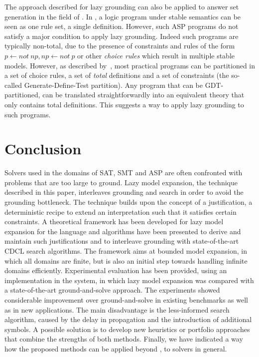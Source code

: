 \documentclass[11pt]{article}
\newcommand{\m}[1]{\ensuremath{#1}\xspace}
\newcommand{\lrule}{\m{\leftarrow}}
\newcommand{\logicname}[1]{\text{\sc #1}\xspace}
\newcommand{\idp}{\logicname{IDP}}
\newcommand{\foid}{\logicname{FO(\ensuremath{ID})}}
\theoremstyle{plain}
\theoremstyle{definition}
\theoremstyle{example_basic}
\theoremstyle{example_contd}
\theoremstyle{plain}
\newcommand{\change}[1]{#1}
\begin{document}
The approach described for lazy grounding can also be applied to answer set generation in the field of \ASP. In \ASP, a logic program under stable semantics can be seen as one rule set, a  single definition. However, such ASP programs do not satisfy a major condition  to apply lazy grounding. Indeed such programs are typically non-total, due to the presence of constraints and rules of the form $p \lrule not~np, np \lrule not~p$ or other \emph{choice rules} which result in multiple stable models.  However, as described by~, most practical \ASP programs can be partitioned in a set of choice rules, a set of \emph{total} definitions and a set of constraints (the so-called Generate-Define-Test partition).  Any \ASP program that can be GDT-partitioned, can be translated straightforwardly into an equivalent \foid theory that only contains total definitions. This suggests a way to apply lazy grounding  to such \ASP programs.

\section{Conclusion}
Solvers used in the domains of SAT, SMT and ASP are often confronted with problems that are too large to ground. Lazy model expansion, the technique described in this paper, interleaves grounding and search in order to avoid the grounding bottleneck. The technique builds upon the concept of a  justification, a deterministic recipe to extend an interpretation such that it satisfies certain constraints. 
A theoretical framework has been developed for lazy model expansion for the language \foid and algorithms have been presented to derive and maintain such justifications and to interleave grounding with state-of-the-art CDCL search algorithms. The framework aims at bounded model expansion, in which all domains are finite, but is also an initial step towards handling infinite domains efficiently. Experimental evaluation has been provided, using an implementation in
the \idp system, in which lazy model expansion was compared with a state-of-the-art ground-and-solve approach. The experiments showed considerable improvement over ground-and-solve in existing benchmarks as well as in new applications.
The main disadvantage is the less-informed search algorithm, caused by the delay in propagation and the introduction of additional symbols. \change{A possible solution is to develop new heuristics or  portfolio approaches that combine the strengths of both methods.} Finally, we have indicated a way how the proposed methods can be applied beyond \foid, to \ASP solvers in general.  
\end{document}
